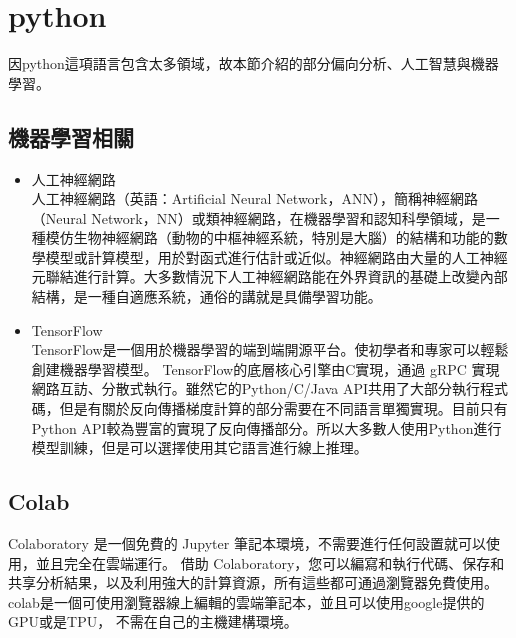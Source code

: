 \section{python}
因python這項語言包含太多領域，故本節介紹的部分偏向分析、人工智慧與機器學習。
\subsection{機器學習相關}
\begin{itemize}
	\item 人工神經網路\\
	人工神經網路（英語：Artificial Neural Network，ANN），簡稱神經網路（Neural Network，NN）或類神經網路，在機器學習和認知科學領域，是一種模仿生物神經網路（動物的中樞神經系統，特別是大腦）的結構和功能的數學模型或計算模型，用於對函式進行估計或近似。神經網路由大量的人工神經元聯結進行計算。大多數情況下人工神經網路能在外界資訊的基礎上改變內部結構，是一種自適應系統，通俗的講就是具備學習功能。\cite{name16}
	\item TensorFlow\\
	TensorFlow是一個用於機器學習的端到端開源平台。使初學者和專家可以輕鬆創建機器學習模型。\cite{name17}
	TensorFlow的底層核心引擎由C實現，通過 gRPC 實現網路互訪、分散式執行。雖然它的Python/C/Java API共用了大部分執行程式碼，但是有關於反向傳播梯度計算的部分需要在不同語言單獨實現。目前只有Python API較為豐富的實現了反向傳播部分。所以大多數人使用Python進行模型訓練，但是可以選擇使用其它語言進行線上推理。 \cite{name18}
	
\end{itemize}
\subsection{Colab}
Colaboratory 是一個免費的 Jupyter 筆記本環境，不需要進行任何設置就可以使用，並且完全在雲端運行。
借助 Colaboratory，您可以編寫和執行代碼、保存和共享分析結果，以及利用強大的計算資源，所有這些都可通過瀏覽器免費使用。\cite{name19}
colab是一個可使用瀏覽器線上編輯的雲端筆記本，並且可以使用google提供的GPU或是TPU，
不需在自己的主機建構環境。
